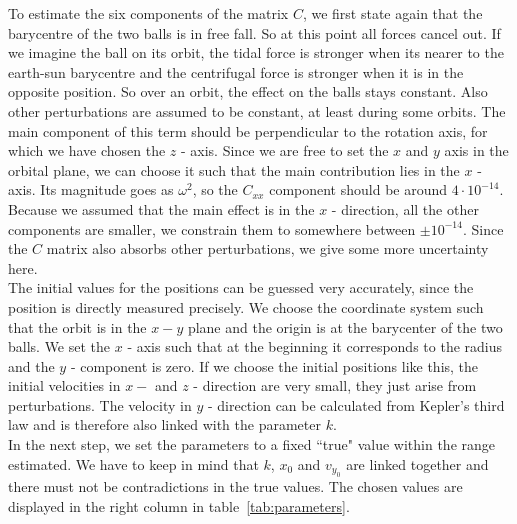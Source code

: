 \documentclass[prb,preprint]{revtex4-1}
\begin{document}
To estimate the six components of the matrix $C$, we first state again that the barycentre of the two balls is in free fall. So at this point all forces cancel out. If we imagine the ball on its orbit, the tidal force is stronger when its nearer to the earth-sun barycentre and the centrifugal force is stronger when it is in the opposite position. So over an orbit, the effect on the balls stays constant. Also other perturbations are assumed to be constant, at least during some orbits.
The main component of this term should be perpendicular to the rotation axis, for which we have chosen the $z$ - axis. Since we are free to set the $x$ and $y$ axis in the orbital plane, we can choose it such that the main contribution lies in the $x$ - axis. Its magnitude goes as $\omega^2$, so the $C_{xx}$ component should be around $4 \cdot 10^{-14}$. Because we assumed that the main effect is in the $x$ - direction, all the other components are smaller, we constrain them to somewhere between $\pm 10^{-14}$. Since the $C$ matrix also absorbs other perturbations, we give some more uncertainty here. \\

The initial values for the positions can be guessed very accurately, since the position is directly measured precisely. We choose the coordinate system such that the orbit is in the $x-y$ plane and the origin is at the barycenter of the two balls. We set the $x$ - axis such that at the beginning it corresponds to the radius and the $y$ - component is zero.
If we choose the initial positions like this, the initial velocities in $x-$ and $z$ - direction are very small, they just arise from perturbations. The velocity in $y$ - direction can be calculated from Kepler's third law and is therefore also linked with the parameter $k$.\\

In the next step, we set the parameters to a fixed ``true" value within the range estimated. We have to keep in mind that $k$, $x_0$ and $v_{y_0}$ are linked together and there must not be contradictions in the true values. The chosen values are displayed in the right column in table~\ref{tab:parameters}.\\
\end{document}
